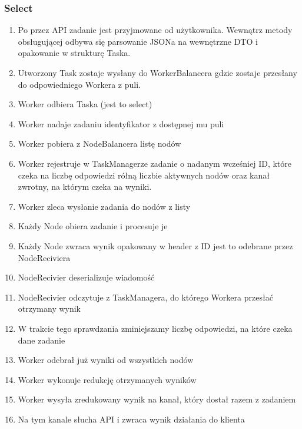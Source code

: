 \documentclass[paper=a4, fontsize=11pt]{scrartcl} %
\numberwithin{equation}{section} %
\numberwithin{figure}{section} %
\numberwithin{table}{section} %
\begin{document}
	\subsubsection{Select}
		\begin{enumerate}
			\item Po przez API zadanie jest przyjmowane od użytkownika. Wewnątrz metody obsługującej odbywa się parsowanie JSONa na wewnętrzne DTO i opakowanie w strukturę Taska. 
			\item Utworzony Task zostaje wysłany do WorkerBalancera gdzie zostaje przesłany do odpowiedniego Workera z puli.
			\item Worker odbiera Taska (jest to select) 		
			\item Worker nadaje zadaniu identyfikator z dostępnej mu puli
			\item Worker pobiera z NodeBalancera listę nodów
			\item Worker rejestruje w TaskManagerze zadanie o nadanym wcześniej ID, które czeka na liczbę odpowiedzi rółną liczbie aktywnych nodów
			oraz kanał zwrotny, na którym czeka na wyniki. 
			\item Worker zleca wysłanie zadania do nodów z listy
			\item Każdy Node obiera zadanie i procesuje je
			\item Każdy Node zwraca wynik opakowany w header z ID jest to odebrane przez NodeReciviera 
			\item NodeRecivier deserializuje wiadomość 
			\item NodeRecivier odczytuje z TaskManagera, do którego Workera przesłać otrzymany wynik
			\item W trakcie tego sprawdzania zminiejszamy liczbę odpowiedzi, na które czeka dane zadanie
			\item Worker odebrał już wyniki od wszystkich nodów 
			\item Worker wykonuje redukcję otrzymanych wyników
			\item Worker wysyła zredukowany wynik na kanał, który dostał razem z zadaniem
			\item Na tym kanale słucha API i zwraca wynik działania do klienta
		\end{enumerate}
\end{document}

